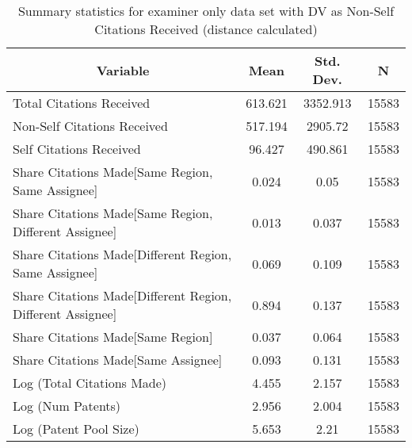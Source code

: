 
\begin{table}[htbp]\centering \caption{Summary statistics for examiner only data set with DV as Non-Self Citations Received (distance calculated) \label{e.nsummary}}
\begin{tabular}{l c c  c}\hline\hline
\multicolumn{1}{c}{\textbf{Variable}} & \textbf{Mean}
 & \textbf{Std. Dev.} & \textbf{N}\\ \hline
Total Citations Received & 613.621 & 3352.913  & 15583\\
Non-Self Citations Received & 517.194 & 2905.72  & 15583\\
Self Citations Received & 96.427 & 490.861  & 15583\\
Share Citations Made[Same Region, Same Assignee] & 0.024 & 0.05  & 15583\\
Share Citations Made[Same Region, Different Assignee] & 0.013 & 0.037  & 15583\\
Share Citations Made[Different Region, Same Assignee] & 0.069 & 0.109  & 15583\\
Share Citations Made[Different Region, Different Assignee] & 0.894 & 0.137  & 15583\\
Share Citations Made[Same Region] & 0.037 & 0.064  & 15583\\
Share Citations Made[Same Assignee] & 0.093 & 0.131  & 15583\\
Log (Total Citations Made) & 4.455 & 2.157  & 15583\\
Log (Num Patents) & 2.956 & 2.004  & 15583\\
Log (Patent Pool Size) & 5.653 & 2.21  & 15583\\
\hline\end{tabular}
\end{table}
